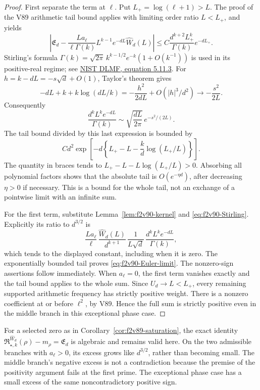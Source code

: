 \documentclass[11pt]{article}
\theoremstyle{definition}
\theoremstyle{remark}
\begin{document}
\begin{proof}
First separate the term at \(\ell\).  Put
\(L_+=\log(\ell+1)>L\).  The proof of the V89 arithmetic tail
bound applies with limiting order ratio \(L<L_+\), and yields
\[
 \left|\mathfrak E_d-
   \frac{L a_\ell}{\ell\Gamma(k)}L^{k-1}e^{-dL}
       \widehat W_d(L)\right|
 \le C\frac{d^{k+2}L_+^k}{\Gamma(k)}e^{-dL_+}.
\]
Stirling's formula
\(\Gamma(k)=\sqrt{2\pi}\,k^{k-1/2}e^{-k}(1+O(k^{-1}))\)
is used in its positive-real regime; see
\href{https://dlmf.nist.gov/5.11.E3}{NIST DLMF, equation 5.11.3}.
For \(h=k-dL=-s\sqrt d+O(1)\), Taylor's theorem gives
\[
 -dL+k+k\log(dL/k)
 =-\frac{h^2}{2dL}+O(|h|^3/d^2)
 \longrightarrow-\frac{s^2}{2L}.
\]
Consequently
\begin{equation}
 \frac{d^kL^ke^{-dL}}{\Gamma(k)}
 \sim\sqrt{\frac{dL}{2\pi}}\,e^{-s^2/(2L)}.
 \label{eq:f2v90-Stirling}
\end{equation}
The tail bound divided by this last expression is bounded by
\[
 C d^2\exp\left[-d\left\{L_+-L
                 -\frac{k}{d}\log(L_+/L)\right\}\right].
\]
The quantity in braces tends to
\(L_+-L-L\log(L_+/L)>0\).  Absorbing all polynomial factors
shows that the absolute tail is \(O(e^{-\eta d})\), after decreasing
\(\eta>0\) if necessary.  This is a bound for the whole tail, not
an exchange of a pointwise limit with an infinite sum.

For the first term, substitute Lemma~\ref{lem:f2v90-kernel} and
\eqref{eq:f2v90-Stirling}.  Explicitly its ratio to \(d^{3/2}\) is
\[
 \frac{L a_\ell}{\ell}\,
 \frac{\widehat W_d(L)}{d^{k+1}}\,
 \frac1{L\sqrt d}\,
 \frac{d^kL^ke^{-dL}}{\Gamma(k)},
\]
which tends to the displayed constant, including when it is zero.
The exponentially bounded tail proves \eqref{eq:f2v90-Euler-limit}.
The nonzero-sign assertions follow immediately.  When \(a_\ell=0\),
the first term vanishes exactly and the tail bound applies to the whole
sum.  Since \(U_d\to L<L_+\), every remaining supported arithmetic
frequency has strictly positive weight.  There is a nonzero coefficient
at or before \(\ell^2\), by V89.  Hence the full sum is strictly
positive even in the middle branch in this exceptional phase case.
\end{proof}

For a selected zero as in Corollary~\ref{cor:f2v89-saturation}, the
exact identity
\(\mathfrak R_{\star,k}^{\widehat W_d}(\rho)-m_\rho
=\mathfrak E_d\) is algebraic and remains valid here.  On the two
admissible branches with \(a_\ell>0\), its excess grows like
\(d^{3/2}\), rather than becoming small.  The middle branch's negative
excess is not a contradiction because the premise of the positivity
argument fails at the first prime.  The exceptional phase case has a
small excess of the same noncontradictory positive sign.
\end{document}
